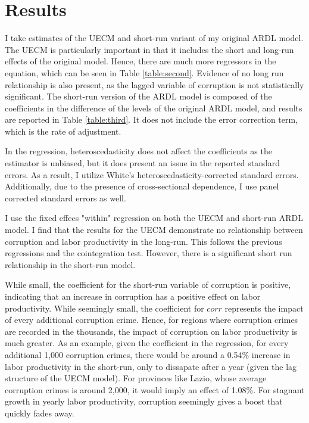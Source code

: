 \documentclass[12pt]{article} %
\begin{document}
\section*{Results}

I take estimates of the UECM and short-run variant of my original ARDL model. The UECM is particularly important in that it includes the short and long-run effects of the original model. Hence, there are much more regressors in the equation, which can be seen in Table \ref{table:second}. Evidence of no long run relationship is also present, as the lagged variable of corruption is not statistically significant. The short-run version of the ARDL model is composed of the coefficients in the difference of the levels of the original ARDL model, and results are reported in Table \ref{table:third}. It does not include the error correction term, which is the rate of adjustment. %

In the regression, heteroscedasticity does not affect the coefficients as the estimator is unbiased, but it does present an issue in the reported standard errors. As a result, I utilize White’s heteroscedasticity-corrected standard errors. Additionally, due to the presence of cross-sectional dependence, I use panel corrected standard errors as well. 

I use the fixed effecs "within" regression on both the UECM and short-run ARDL model. I find that the results for the UECM demonstrate no relationship between corruption and labor productivity in the long-run. This follows the previous regressions and the cointegration test. However, there is a significant short run relationship in the short-run model.

While small, the coefficient for the short-run variable of corruption is positive, indicating that an increase in corruption has a positive effect on labor productivity. While seemingly small, the coefficient for $corr$ represents the impact of every additional corruption crime. Hence, for regions where corruption crimes are recorded in the thousands, the impact of corruption on labor productivity is much greater. As an example, given the coefficient in the regression, for every additional 1,000 corruption crimes, there would be around a 0.54\% increase in labor productivity in the short-run, only to dissapate after a year (given the lag structure of the UECM model). For provinces like Lazio, whose average corruption crimes is around 2,000, it would imply an effect of 1.08\%. For stagnant growth in yearly labor productivity, corruption seemingly gives a boost that quickly fades away. 
\end{document}
